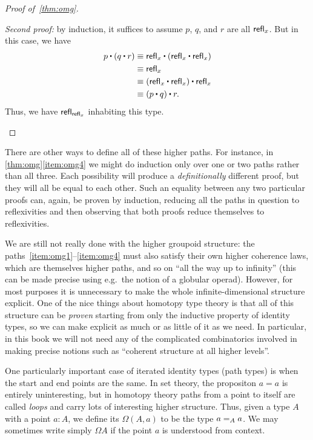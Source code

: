 \begin{proof}[Proof of~\autoref{thm:omg}]
\begin{enumerate}
    \mentalpause

    \noindent \emph{Second proof:} by induction, it suffices to assume $p$, $q$, and $r$ are all $\refl x$.
    But in this case, we have
    \begin{align*}
      p\ct (q\ct r)
      &\jdeq \refl{x}\ct(\refl{x}\ct \refl{x})\\
      &\jdeq \refl{x}\\
      &\jdeq (\refl{x}\ct \refl x)\ct \refl x\\
      &\jdeq (p\ct q)\ct r.
    \end{align*}
    Thus, we have $\refl{\refl{x}}$ inhabiting this type. \qedhere
  \end{enumerate}
\end{proof}

\begin{rmk}
  There are other ways to define all of these higher paths.
  For instance, in \autoref{thm:omg}\ref{item:omg4} we might do induction only over one or two paths rather than all three.
  Each possibility will produce a \emph{definitionally} different proof, but they will all be equal to each other.
  Such an equality between any two particular proofs can, again, be proven by induction, reducing all the paths in question to reflexivities and then observing that both proofs reduce themselves to reflexivities.
\end{rmk}

We are still not really done with the higher groupoid structure: the paths~\ref{item:omg1}--\ref{item:omg4} must also satisfy their own higher coherence laws, which are themselves higher paths, and so on ``all the way up to infinity'' (this can be made precise using e.g.\ the notion of a globular operad).
However, for most purposes it is unnecessary to make the whole infinite-dimensional structure explicit.
One of the nice things about homotopy type theory is that all of this structure can be \emph{proven} starting from only the inductive property of identity types, so we can make explicit as much or as little of it as we need.
In particular, in this book we will not need any of the complicated combinatorics involved in making precise notions such as ``coherent structure at all higher levels''.

One particularly important case of iterated identity types (path types) is when the start and end points are the same.
In set theory, the propositon $a=a$ is entirely uninteresting, but in homotopy theory paths from a point to itself are called \emph{loops} and carry lots of interesting higher structure.
Thus, given a type $A$ with a point $a:A$, we define its 
%
$\Omega(A,a)$ to be the type $\id[A]{a}{a}$.
We may sometimes write simply $\Omega A$ if the point $a$ is understood from context.


